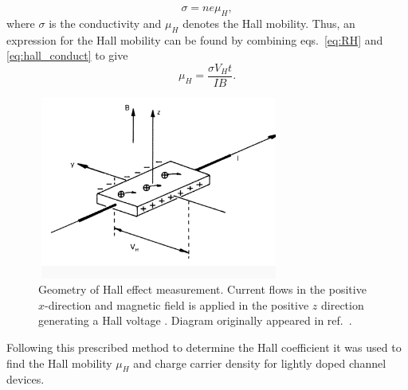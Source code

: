 \begin{equation}\label{eq:hall_conduct}
	\sigma = n e \mu_H,
\end{equation}
where $\sigma$ is the conductivity and $\mu_H$ denotes the Hall mobility. Thus, an expression for the Hall mobility can be found by combining eqs.~\ref{eq:RH} and \ref{eq:hall_conduct} to give
\begin{equation}\label{eq:mu_H}
	\mu_H = \frac{\sigma V_H t}{I B}.
\end{equation}
\begin{figure}[ht]
	\centering
	\includegraphics[height=6cm,width=8cm]{figs/results/hall_diagram}
	\caption[Hall effect measurement diagram]{Geometry of Hall effect measurement. Current flows in the positive $x$-direction and magnetic field is applied in the positive $z$ direction generating a Hall voltage \cite{HallEffectNIST}. Diagram originally appeared in ref.~\cite{HallDiagram}.}
	\label{fig:hall_diagram}
\end{figure}
\noindent Following this prescribed method to determine the Hall coefficient it was used to find the Hall mobility $\mu_H$ and charge carrier density for lightly doped channel  devices.
